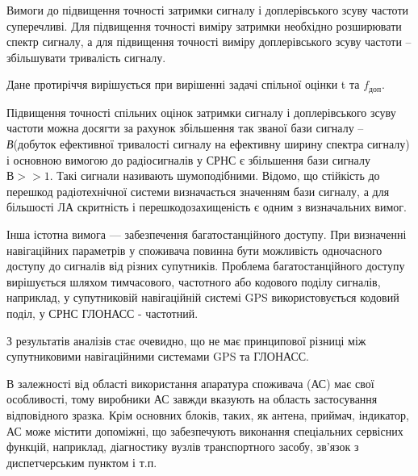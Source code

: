 Вимоги до підвищення точності затримки сигналу і доплерівського зсуву частоти суперечливі. 
Для підвищення точності виміру затримки необхідно розширювати спектр сигналу, а для підвищення 
точності виміру  доплерівського зсуву частоти --  збільшувати тривалість сигналу.

Дане протиріччя вирішується при вирішенні задачі спільної оцінки t та  $f_\text{доп}$.

Підвищення точності спільних оцінок затримки сигналу і доплерівського зсуву частоти можна 
досягти за рахунок збільшення так званої  бази сигналу -- \textit{В}(добуток ефективної 
тривалості сигналу на ефективну ширину спектра сигналу) і основною вимогою до радіосигналів у 
СРНС є збільшення бази сигналу $В>>1$. Такі сигнали називають шумоподібними. 
Відомо, що стійкість до перешкод радіотехнічної системи визначається значенням бази сигналу, 
а для більшості ЛА скритність і перешкодозахищеність є одним з визначальних вимог. 

Інша істотна вимога --- забезпечення багатостанційного доступу. При визначенні навігаційних 
параметрів у споживача повинна бути можливість одночасного доступу до сигналів від різних 
супутників. Проблема багатостанційного доступу вирішується шляхом тимчасового, частотного 
або кодового поділу сигналів, наприклад, у супутниковій навігаційній системі GPS використовується 
кодовий поділ, у СРНС ГЛОНАСС - частотний.

З результатів аналізів стає очевидно, що не має принципової різниці між супутниковими 
навігаційними системами GPS та ГЛОНАСС.

В залежності від області використання апаратура споживача (АС) має свої особливості, 
тому виробники АС завжди вказують на область застосування відповідного зразка. Крім 
основних блоків, таких, як антена, приймач, індикатор, АС може містити допоміжні, що 
забезпечують виконання спеціальних сервісних функцій, наприклад, діагностику вузлів 
транспортного засобу, зв'язок з диспетчерським пунктом і т.п.

